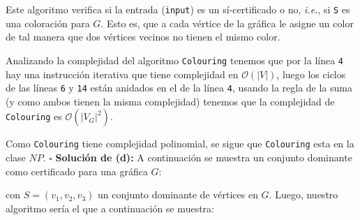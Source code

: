 \documentclass{article}
\newcommand{\code}[1]{\textcolor{white!25!black}{\texttt{#1}}}
\begin{document}
Este algoritmo verifica si la entrada (\code{input}) es un s\'i-certificado o no,
\textit{i.e.}, si \code{S} es una coloraci\'on para $G$. Esto es, que a cada v\'ertice
de la gr\'afica le asigne un color de tal manera que dos v\'ertices vecinos no tienen
el mismo color.
\vspace*{0.3cm}

Analizando la complejidad del algoritmo \code{Colouring} tenemos que por la l\'inea
\code{4} hay una instrucci\'on iterativa que tiene complejidad en $\mathcal{O}(|V|)$,
luego los ciclos de las l\'ineas \code{6} y \code{14} est\'an anidados en el de la
l\'inea \code{4}, usando la regla de la suma (y como ambos tienen la misma complejidad)
tenemos que la complejidad de \code{Colouring} es $\mathcal{O}(|V_G|^2)$.
\vspace*{0.3cm}

Como \code{Colouring} tiene complejidad polinomial, se sigue que \code{Colouring} esta
en la clase $NP$. \hfill $\square$
\vspace*{0.3cm}
\newpage
\textbf{Soluci\'on de (d):}
A continuaci\'on se muestra un conjunto dominante como certificado para una gr\'afica $G$:
\begin{figure}[ht!]
  \centering
\end{figure}

con $S = (v_1, v_2, v_3)$ un conjunto dominante de v\'ertices en $G$. Luego,
nuestro algoritmo ser\'ia el que a continuaci\'on se muestra:
\end{document}
